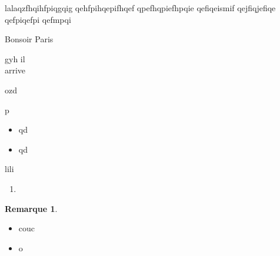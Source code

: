 \documentclass[french]{article}
\title{}
\date{}
\theoremstyle{plain}
\theoremstyle{definition}
\newtheorem*{rmq}{Remarque}
\theoremstyle{remark}
\begin{document}
\tableofcontents

\newpage
\maketitle

\begin{exo}[$\star$]
	lalaqzfhqihfpiqgqig qehfpihqepifhqef qpefhqpiefhpqie qefiqeismif qejfiqjefiqe qefpiqefpi qefmpqi
\end{exo}

\begin{met}
	Bonsoir Paris
\end{met}

\begin{thm}
	gyh il\\
	arrive
\end{thm}

\begin{lem}
	ozd
\end{lem}

\begin{lem}
	
\end{lem}

\begin{cor}
	p
\end{cor}

\begin{prop}
	\begin{itemize}
		\item qd
		\item qd
	\end{itemize}
\end{prop}

\begin{dfn}
	lili
\end{dfn}

\begin{dfn}[(HP)]
	\begin{enumerate}
		\item 
	\end{enumerate}
\end{dfn}

\begin{rmq}
	\begin{itemize}
		\item couc
		\item o
	\end{itemize}
\end{rmq}

\section{}
\end{document}
